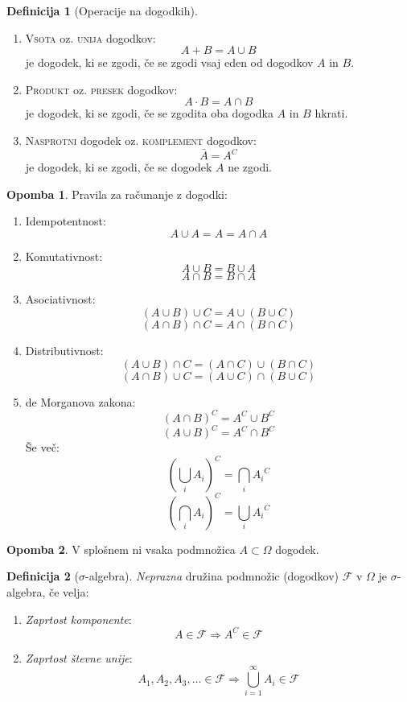 \documentclass[11pt]{article}
\theoremstyle{definition}
\newtheorem{definicija}{Definicija}[section]
\theoremstyle{definition}
\theoremstyle{definition}
\newtheorem*{opomba}{Opomba}
\begin{document}
\begin{definicija}[Operacije na dogodkih]
~
\begin{enumerate}
	\item \textsc{Vsota} oz. \textsc{unija} dogodkov:
	$$A + B = A \cup B$$
	je dogodek, ki se zgodi, če se zgodi vsaj eden od dogodkov $A$ in $B$. \\
	\item \textsc{Produkt} oz. \textsc{presek} dogodkov:
	$$A \cdot B = A \cap B$$
	je dogodek, ki se zgodi, če se zgodita oba dogodka $A$ in $B$ hkrati.
	\item \textsc{Nasprotni} dogodek oz. \textsc{komplement} dogodkov:
	$$\bar{A} = A^C$$
	je dogodek, ki se zgodi, če se dogodek $A$ ne zgodi.
\end{enumerate}
\end{definicija}
\vspace{0.5cm}

\begin{opomba}

Pravila za računanje z dogodki:
\begin{enumerate}
	\item Idempotentnost: 
	$$A \cup A = A = A \cap A$$
	\item Komutativnost:
	$$A \cup B = B \cup A$$
	$$A \cap B = B \cap A$$
	\item Asociativnost:
	$$(A \cup B) \cup C = A \cup (B \cup C)$$
	$$(A \cap B) \cap C = A \cap (B \cap C)$$
	\item Distributivnost:
	$$(A \cup B) \cap C = (A \cap C) \cup (B \cap C)$$
	$$(A \cap B) \cup C = (A \cup C) \cap (B \cup C)$$
	\item de Morganova zakona:
	$$(A \cap B)^C = A^C \cup B^C$$
	$$(A \cup B)^C = A^C \cap B^C$$
	Še več:
	$$\left( \bigcup_i A_i \right)^C = \bigcap_i {A_i}^C$$
	$$\left( \bigcap_i A_i \right)^C = \bigcup_i {A_i}^C$$
\end{enumerate}
\end{opomba}
\vspace{0.5cm}

\begin{opomba}

V splošnem ni vsaka podmnožica $A \subset \Omega$ dogodek.

\end{opomba}
\vspace{0.5cm}

\begin{definicija}[$\sigma$-algebra]

\textit{Neprazna} družina podmnožic (dogodkov) $\mathcal{F}$ v $\Omega$ je $\sigma$-algebra, če velja:
\begin{enumerate}
	\item \textit{Zaprtost komponente}:
	$$A \in \mathcal{F} \Rightarrow A^C \in \mathcal{F}$$
	\item \textit{Zaprtost števne unije}:
	$$A_1, A_2, A_3, \ldots \in \mathcal{F} \Rightarrow \bigcup_{i=1}^{\infty} A_i \in \mathcal{F}$$
\end{enumerate}
\end{definicija}
\vspace{0.5cm}
\end{document}
